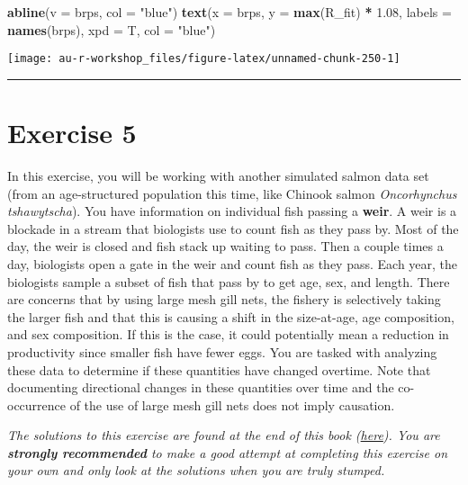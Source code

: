 \documentclass[]{book}
\newenvironment{Shaded}{\begin{snugshade}}{\end{snugshade}}
\newcommand{\KeywordTok}[1]{\textcolor[rgb]{0.13,0.29,0.53}{\textbf{#1}}}
\newcommand{\DataTypeTok}[1]{\textcolor[rgb]{0.13,0.29,0.53}{#1}}
\newcommand{\FloatTok}[1]{\textcolor[rgb]{0.00,0.00,0.81}{#1}}
\newcommand{\StringTok}[1]{\textcolor[rgb]{0.31,0.60,0.02}{#1}}
\newcommand{\OperatorTok}[1]{\textcolor[rgb]{0.81,0.36,0.00}{\textbf{#1}}}
\newcommand{\NormalTok}[1]{#1}
\theoremstyle{definition}
\theoremstyle{definition}
\theoremstyle{definition}
\theoremstyle{remark}
\begin{document}
\begin{Shaded}
\begin{Highlighting}[]
\KeywordTok{abline}\NormalTok{(}\DataTypeTok{v =}\NormalTok{ brps, }\DataTypeTok{col =} \StringTok{"blue"}\NormalTok{)}
\KeywordTok{text}\NormalTok{(}\DataTypeTok{x =}\NormalTok{ brps, }\DataTypeTok{y =} \KeywordTok{max}\NormalTok{(R_fit) }\OperatorTok{*}\StringTok{ }\FloatTok{1.08}\NormalTok{, }
     \DataTypeTok{labels =} \KeywordTok{names}\NormalTok{(brps), }\DataTypeTok{xpd =}\NormalTok{ T, }\DataTypeTok{col =} \StringTok{"blue"}\NormalTok{)}
\end{Highlighting}
\end{Shaded}

\begin{center}\texttt{[image: au-r-workshop\_files/figure-latex/unnamed-chunk-250-1]} \end{center}

\begin{center}\rule{0.5\linewidth}{\linethickness}\end{center}

\section*{Exercise 5}\label{exercise-5}

In this exercise, you will be working with another simulated salmon data
set (from an age-structured population this time, like Chinook salmon
\emph{Oncorhynchus tshawytscha}). You have information on individual
fish passing a \textbf{weir}. A weir is a blockade in a stream that
biologists use to count fish as they pass by. Most of the day, the weir
is closed and fish stack up waiting to pass. Then a couple times a day,
biologists open a gate in the weir and count fish as they pass. Each
year, the biologists sample a subset of fish that pass by to get age,
sex, and length. There are concerns that by using large mesh gill nets,
the fishery is selectively taking the larger fish and that this is
causing a shift in the size-at-age, age composition, and sex
composition. If this is the case, it could potentially mean a reduction
in productivity since smaller fish have fewer eggs. You are tasked with
analyzing these data to determine if these quantities have changed
overtime. Note that documenting directional changes in these quantities
over time and the co-occurrence of the use of large mesh gill nets does
not imply causation.

\emph{The solutions to this exercise are found at the end of this book
(\protect\hyperlink{ex5-answers}{here}). You are \textbf{strongly
recommended} to make a good attempt at completing this exercise on your
own and only look at the solutions when you are truly stumped.}
\end{document}
